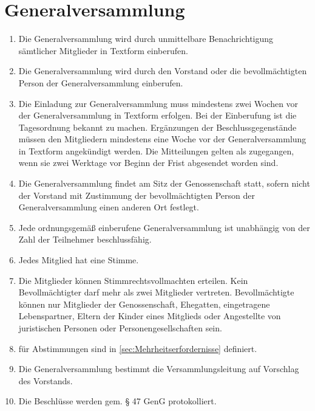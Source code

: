 \documentclass[a4paper, 12pt]{scrartcl}
\begin{document}
\section{Generalversammlung}
\begin{enumerate}
  \item Die Generalversammlung wird durch unmittelbare Benachrichtigung sämtlicher Mitglieder in Textform einberufen.
  \item Die Generalversammlung wird durch den Vorstand oder die bevollmächtigten Person der Generalversammlung einberufen.
  \item Die Einladung zur Generalversammlung muss mindestens zwei Wochen vor der Generalversammlung in Textform erfolgen. Bei der Einberufung ist die Tagesordnung bekannt zu machen. Ergänzungen der Beschlussgegenstände müssen den Mitgliedern mindestens eine Woche vor der Generalversammlung in Textform angekündigt werden. Die Mitteilungen gelten als zugegangen, wenn sie zwei Werktage vor Beginn der Frist abgesendet worden sind.
  \item Die Generalversammlung findet am Sitz der Genossenschaft statt, sofern nicht der Vorstand mit Zustimmung der bevollmächtigten Person der Generalversammlung einen anderen Ort festlegt.
  \item Jede ordnungsgemäß einberufene Generalversammlung ist unabhängig von der Zahl der Teilnehmer beschlussfähig.
  \item Jedes Mitglied hat eine Stimme.
  \item Die Mitglieder können Stimmrechtsvollmachten erteilen. Kein Bevollmächtigter darf mehr als zwei Mitglieder vertreten. Bevollmächtigte können nur Mitglieder der Genossenschaft, Ehegatten, eingetragene Lebenspartner, Eltern der Kinder eines Mitglieds oder Angestellte von juristischen Personen oder Personengesellschaften sein.
  \item {} für Abstimmungen sind in \autoref{sec:Mehrheitserfordernisse} definiert.
  \item Die Generalversammlung bestimmt die Versammlungsleitung auf Vorschlag des Vorstands.
  \item Die Beschlüsse werden gem. § 47 GenG protokolliert.
\end{enumerate}
\end{document}
